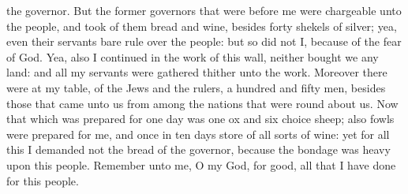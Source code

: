 the governor. But the former governors that were before me were chargeable unto the people, and took of them bread and wine, besides forty shekels of silver; yea, even their servants bare rule over the people: but so did not I, because of the fear of God. Yea, also I continued in the work of this wall, neither bought we any land: and all my servants were gathered thither unto the work. Moreover there were at my table, of the Jews and the rulers, a hundred and fifty men, besides those that came unto us from among the nations that were round about us. Now that which was prepared for one day was one ox and six choice sheep; also fowls were prepared for me, and once in ten days store of all sorts of wine: yet for all this I demanded not the bread of the governor, because the bondage was heavy upon this people. Remember unto me, O my God, for good, all that I have done for this people. 


